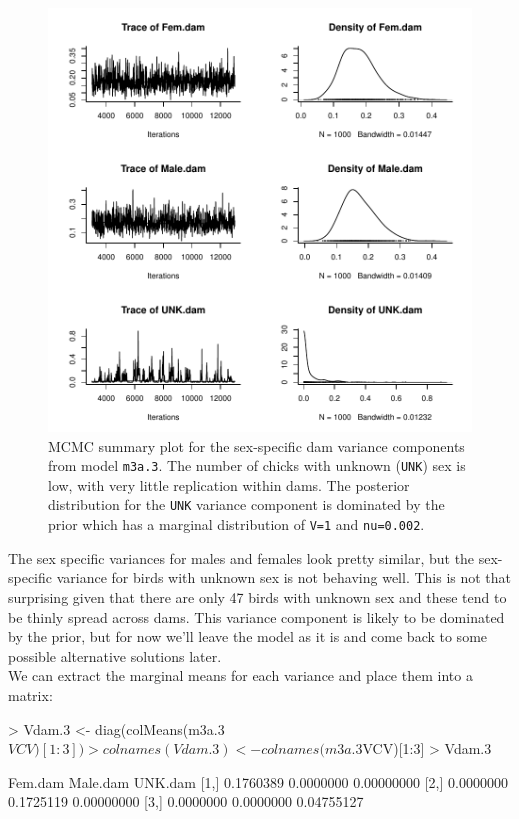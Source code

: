 \documentclass{article}
\begin{document}
\begin{figure}[!h]
\begin{center}
\includegraphics{Lecture3-018}
\end{center}
\caption{MCMC summary plot for the sex-specific dam variance components from model \texttt{m3a.3}. The number of chicks with unknown (\texttt{UNK}) sex is low, with very little replication within dams. The posterior distribution for the \texttt{UNK} variance component is dominated by the prior which has a marginal distribution of \texttt{V=1} and \texttt{nu=0.002}.}
\label{BTidh-fig}
\end{figure}

The sex specific variances for males and females look pretty similar, but the sex-specific variance for birds with unknown sex is not behaving well. This is not that surprising given that there are only 47 birds with unknown sex and these tend to be thinly spread across dams. This variance component is likely to be dominated by the prior, but for now we'll leave the model as it is and come back to some possible alternative solutions later.\\

We can extract the marginal means for each variance and place them into a matrix:

\begin{Schunk}
\begin{Sinput}
> Vdam.3 <- diag(colMeans(m3a.3$VCV)[1:3])
> colnames(Vdam.3) <- colnames(m3a.3$VCV)[1:3]
> Vdam.3
\end{Sinput}
\begin{Soutput}
       Fem.dam  Male.dam    UNK.dam
[1,] 0.1760389 0.0000000 0.00000000
[2,] 0.0000000 0.1725119 0.00000000
[3,] 0.0000000 0.0000000 0.04755127
\end{Soutput}
\end{Schunk}
\end{document}
